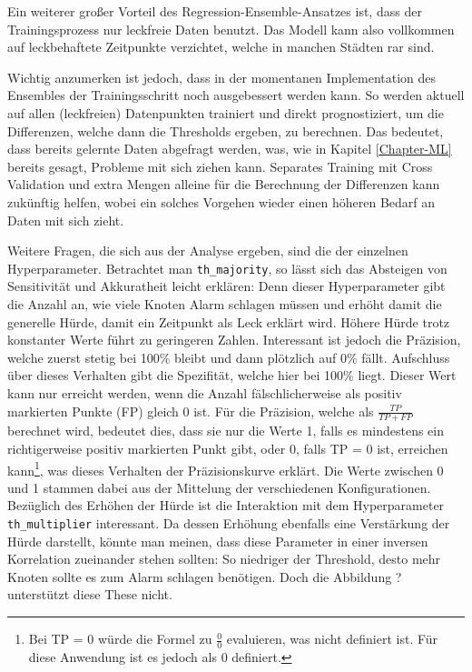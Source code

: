 Ein weiterer großer Vorteil des Regression-Ensemble-Ansatzes ist, dass der Trainingsprozess nur leckfreie Daten
 benutzt. Das Modell kann also vollkommen auf leckbehaftete Zeitpunkte verzichtet, welche in manchen Städten rar
 sind.

Wichtig anzumerken ist jedoch, dass in der momentanen Implementation des Ensembles der Trainingsschritt noch
 ausgebessert werden kann. So werden aktuell auf allen (leckfreien) Datenpunkten trainiert und direkt
 prognostiziert, um die Differenzen, welche dann die Thresholds ergeben, zu berechnen. Das bedeutet, dass
 bereits gelernte Daten abgefragt werden, was, wie in Kapitel \ref{Chapter-ML} bereits gesagt, Probleme mit
 sich ziehen kann. Separates Training mit Cross Validation und extra Mengen alleine für die Berechnung der
 Differenzen kann zukünftig helfen, wobei ein solches Vorgehen wieder einen höheren Bedarf an Daten mit sich zieht.

Weitere Fragen, die sich aus der Analyse ergeben, sind die der einzelnen Hyperparameter. Betrachtet man
 \texttt{th\_majority}, so lässt sich das Absteigen von Sensitivität und Akkuratheit leicht erklären: Denn dieser
 Hyperparameter gibt die Anzahl an, wie viele Knoten Alarm schlagen müssen und erhöht damit die generelle Hürde,
 damit ein Zeitpunkt als Leck erklärt wird. Höhere Hürde trotz konstanter Werte führt zu geringeren Zahlen.
 Interessant ist jedoch die Präzision, welche zuerst stetig bei 100\% bleibt und dann plötzlich auf 0\%
 fällt. Aufschluss über dieses Verhalten gibt die Spezifität, welche hier bei 100\% liegt. Dieser Wert kann
 nur erreicht werden, wenn die Anzahl fälschlicherweise als positiv markierten Punkte (FP) gleich 0 ist.
 Für die Präzision, welche als $\frac{TP}{TP+FP}$ berechnet wird, bedeutet dies, dass sie nur die Werte 1, falls
 es mindestens ein richtigerweise positiv markierten Punkt gibt, oder 0, falls TP = 0 ist, erreichen
 kann\footnote{Bei TP = 0 würde die Formel zu $\frac{0}{0}$ evaluieren, was nicht definiert ist. Für diese Anwendung
 ist es jedoch als 0 definiert.}, was dieses Verhalten der Präzisionskurve erklärt. Die Werte zwischen 0 und 1
 stammen dabei aus der Mittelung der verschiedenen Konfigurationen. Bezüglich des Erhöhen der Hürde ist die
 Interaktion mit dem Hyperparameter \texttt{th\_multiplier} interessant. Da dessen Erhöhung ebenfalls eine
 Verstärkung der Hürde darstellt, könnte man meinen, dass diese Parameter in einer inversen Korrelation
 zueinander stehen sollten: So niedriger der Threshold, desto mehr Knoten sollte es zum Alarm schlagen
 benötigen. Doch die Abbildung ? unterstützt diese These nicht.

